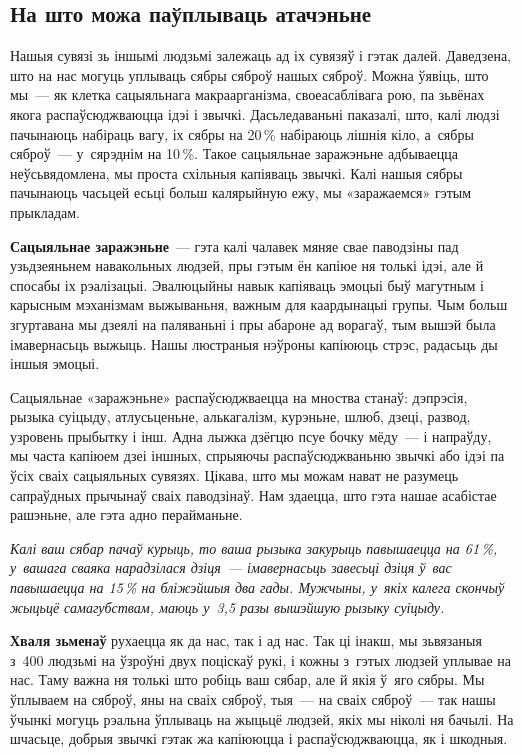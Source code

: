 \subsection*{На што можа паўплываць атачэньне}

Нашыя сувязі зь іншымі людзьмі залежаць ад іх сувязяў і гэтак далей. Даведзена, што на нас могуць уплываць сябры сяброў нашых сяброў. Можна ўявіць, што мы~--- як клетка сацыяльнага макраарганізма, своеасаблівага рою, па зьвёнах якога распаўсюджваюцца ідэі і звычкі. Дасьледаваньні паказалі, што, калі людзі пачынаюць набіраць вагу, іх сябры на 20\,\% набіраюць лішнія кіло, а~сябры сяброў~--- у~сярэднім на 10\,\%. Такое сацыяльнае заражэньне адбываецца неўсьвядомлена, мы проста схільныя капіяваць звычкі. Калі нашыя сябры пачынаюць часьцей есьці больш калярыйную ежу, мы «заражаемся» гэтым прыкладам.

\textbf{Сацыяльнае заражэньне}~--- гэта калі чалавек мяняе свае паводзіны пад узьдзеяньнем навакольных людзей, пры гэтым ён капіюе ня толькі ідэі, але й спосабы іх рэалізацыі. Эвалюцыйны навык капіяваць эмоцыі быў магутным і карысным мэханізмам выжываньня, важным для каардынацыі групы. Чым больш згуртавана мы дзеялі на паляваньні і пры абароне ад ворагаў, тым вышэй была імавернасьць выжыць. Нашы люстраныя нэўроны капіююць стрэс, радасьць ды іншыя эмоцыі.


Сацыяльнае «заражэньне» распаўсюджваецца на мноства станаў: дэпрэсія, рызыка суіцыду, атлусьценьне, алькагалізм, курэньне, шлюб, дзеці, развод, узровень прыбытку і інш. Адна лыжка дзёгцю псуе бочку мёду~--- і напраўду, мы часта капіюем дзеі іншных, спрыяючы распаўсюджваньню звычкі або ідэі па ўсіх сваіх сацыяльных сувязях. Цікава, што мы можам нават не разумець сапраўдных прычынаў сваіх паводзінаў. Нам здаецца, што гэта нашае асабістае рашэньне, але гэта адно перайманьне.

\emph{Калі ваш сябар пачаў курыць, то ваша рызыка закурыць павышаецца на 61\,\%, у~вашага сваяка нарадзілася дзіця~--- імавернасьць завесьці дзіця ў~вас павышаецца на 15\,\% на бліжэйшыя два гады. Мужчыны, у~якіх калега скончыў жыцьцё самагубствам, маюць у~3,5 разы вышэйшую рызыку суіцыду.}

\textbf{Хваля зьменаў} рухаецца як да нас, так і ад нас. Так ці інакш, мы зьвязаныя з~400 людзьмі на ўзроўні двух поціскаў рукі, і кожны з~гэтых людзей уплывае на нас. Таму важна ня толькі што робіць ваш сябар, але й якія ў~яго сябры. Мы ўплываем на сяброў, яны на сваіх сяброў, тыя~--- на сваіх сяброў~--- так нашы ўчынкі могуць рэальна ўплываць на жыцьцё людзей, якіх мы ніколі ня бачылі. На шчасьце, добрыя звычкі гэтак жа капіююцца і распаўсюджваюцца, як і шкодныя.

